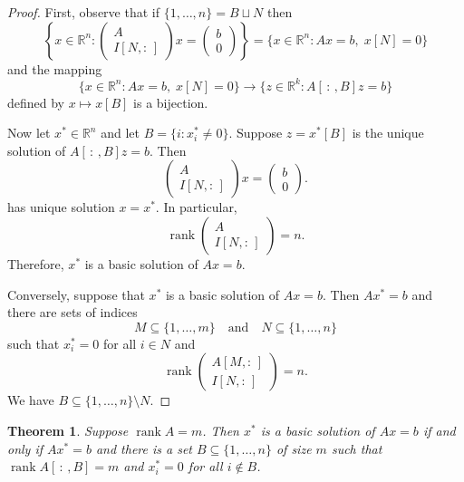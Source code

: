 \documentclass[12pt]{amsart}
\newtheorem{theorem}{Theorem}[section]
\theoremstyle{definition}
\theoremstyle{remark}
\numberwithin{equation}{section}
\newcommand{\RR}{\mathbb{R}}
\DeclareMathOperator{\rank}{rank}
\begin{document}
\begin{proof}
    First, observe that if $\{1,\ldots,n\} = B\sqcup N$ then
    \[
        \left\{x\in\RR^n : \begin{pmatrix}A\\I[N,:\,]\end{pmatrix}x
        =\begin{pmatrix}b\\0\end{pmatrix}\right\}
        = \{x\in\RR^n : Ax=b,\;x[N]=0\}
    \]
    and the mapping
    \[
        \{x\in\RR^n : Ax=b,\;x[N]=0\}\longrightarrow
        \{z\in\RR^k : A[\,:\,,B]z=b\}
    \]
    defined by $x\mapsto x[B]$ is a bijection.

    Now let $x^*\in\RR^n$ and let $B=\{i : x_i^*\neq 0\}$.
    Suppose $z=x^*[B]$ is the unique solution of $A[\,:\,,B]z = b$.
    Then
    \[
        \begin{pmatrix}A\\I[N,:\,]\end{pmatrix}x
        =\begin{pmatrix}b\\0\end{pmatrix}.
    \]
    has unique solution $x=x^*$.
    In particular,
    \[
        \rank\begin{pmatrix}A\\I[N,:\,]\end{pmatrix}=n.
    \]
    Therefore, $x^*$ is a basic solution of $Ax=b$.

    Conversely, suppose that $x^*$ is a basic solution of $Ax=b$.
    Then $Ax^*=b$ and there are sets of indices
    \[
        M\subseteq\{1,\ldots,m\}\quad\text{and}\quad
        N\subseteq\{1,\ldots,n\}
    \]
    such that $x_i^*=0$ for all $i\in N$ and
    \[
        \rank\begin{pmatrix}
            A[M,:\,]\\I[N,:\,]
        \end{pmatrix}=n.
    \]
    We have $B\subseteq \{1,\ldots,n\}\setminus N$.




\end{proof}

\begin{theorem}
    Suppose $\rank A=m$.
    Then $x^*$ is a basic solution of $Ax=b$ if and only if $Ax^*=b$ and
    there is a set $B\subseteq\{1,\ldots,n\}$ of size $m$
    such that $\rank A[\,:\,,B]=m$ and $x_i^*=0$ for all $i\notin B$.
\end{theorem}
\end{document}
